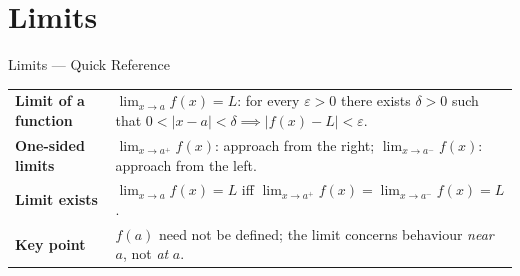 
\section{Limits}

\begin{toolkitbox}{Limits --- Quick Reference}
\begin{tabular}{@{}p{}p{}@{}}
\textbf{Limit of a function} & $\lim_{x \to a} f(x) = L$: for every $\varepsilon > 0$ there exists $\delta > 0$ such that $0 < |x-a| < \delta \implies |f(x) - L| < \varepsilon$. \\[4pt]
\textbf{One-sided limits}    & $\lim_{x \to a^+} f(x)$: approach from the right; $\lim_{x \to a^-} f(x)$: approach from the left. \\[4pt]
\textbf{Limit exists}        & $\lim_{x \to a} f(x) = L$ iff $\lim_{x \to a^+} f(x) = \lim_{x \to a^-} f(x) = L$. \\[4pt]
\textbf{Key point}           & $f(a)$ need not be defined; the limit concerns behaviour \emph{near} $a$, not \emph{at} $a$. \\
\end{tabular}
\end{toolkitbox}






